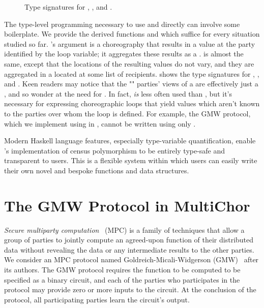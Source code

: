 \begin{figure*}[tbhp]
  \begin{mdframed}
    \inputminted[xleftmargin=10pt,linenos,fontsize=\scriptsize]{haskell}{figures/census-poly-haskell.hs.txt}
    \caption{
        Type signatures for , , and .
    }
    \label{fig:census-poly-haskell}
  \end{mdframed}
\end{figure*}

The type-level programming necessary to use  and  directly
can involve some boilerplate.
We provide the derived functions  and 
which suffice for every situation studied so far.
's argument is a choreography that results in a  value at the party identified by the loop variable;
it aggregates these results as a .
 is almost the same, except that the locations of the resulting values do not vary,
and they are aggregated in a  located at some list of recipients.
 shows the type signatures for , , and .
Keen readers may notice that the "" parties' views of a  are effectively just a ,
and so wonder at the need for .
In fact,  \emph{is} less often used than ,
but it's necessary for expressing choreographic loops that yield values which aren't known to the parties over whom the loop is defined.
For example, the GMW protocol, which we implement using \MultiChor in , cannot be written using only .

Modern Haskell language features, especially type-variable quantification,
enable \MultiChor's implementation of census polymorphism to be entirely type-safe and transparent to users.
This is a flexible system within which users can easily write their own novel and bespoke functions and data structures.


\section{The GMW Protocol in MultiChor}
\label{sec:mpc}

\emph{Secure multiparty computation}~\cite{evans2018pragmatic} (MPC) is a family of techniques that allow a group of parties to jointly compute an agreed-upon function of their distributed data without revealing the data or any intermediate results to the other parties. We consider an MPC protocol named Goldreich-Micali-Widgerson (GMW)~\cite{goldreich2019play} after its authors. The GMW protocol requires the function to be computed to be specified as a binary circuit, and each of the parties who participates in the protocol may provide zero or more inputs to the circuit. At the conclusion of the protocol, all participating parties learn the circuit's output.

